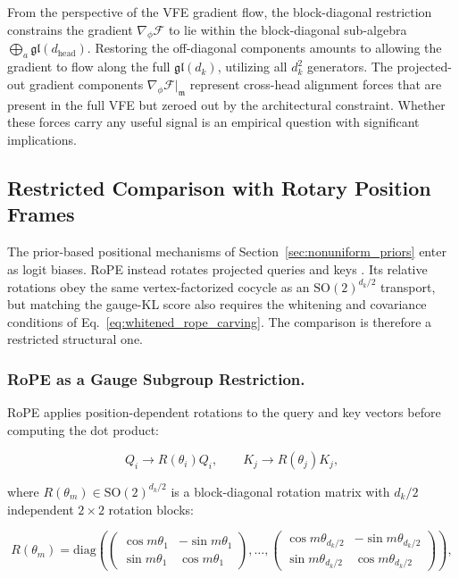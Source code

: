 \documentclass[twoside,11pt]{article}
\begin{document}
From the perspective of the VFE gradient flow, the block-diagonal restriction constrains the gradient $\nabla_\phi \mathcal{F}$ to lie within the block-diagonal sub-algebra $\bigoplus_a \mathfrak{gl}(d_{\text{head}})$. Restoring the off-diagonal components amounts to allowing the gradient to flow along the full $\mathfrak{gl}(d_k)$, utilizing all $d_k^2$ generators. The projected-out gradient components $\nabla_\phi \mathcal{F}\big|_{\mathfrak{m}}$ represent cross-head alignment forces that are present in the full VFE but zeroed out by the architectural constraint. Whether these forces carry any useful signal is an empirical question with significant implications.



\subsection{Restricted Comparison with Rotary Position Frames}
\label{sec:rope}

The prior-based positional mechanisms of Section~\ref{sec:nonuniform_priors} enter as logit biases. RoPE instead rotates projected queries and keys \citep{su2024roformer}. Its relative rotations obey the same vertex-factorized cocycle as an $\mathrm{SO}(2)^{d_k/2}$ transport, but matching the gauge-KL score also requires the whitening and covariance conditions of Eq.~\eqref{eq:whitened_rope_carving}. The comparison is therefore a restricted structural one.

\subsubsection{RoPE as a Gauge Subgroup Restriction.}

RoPE applies position-dependent rotations to the query and key vectors before computing the dot product:

\begin{equation}
Q_i \to R(\theta_i) Q_i, \qquad K_j \to R(\theta_j) K_j,
\end{equation}

where $R(\theta_m) \in \mathrm{SO}(2)^{d_k/2}$ is a block-diagonal rotation matrix with $d_k/2$ independent $2\times 2$ rotation blocks:

\begin{equation}
R(\theta_m) = \mathrm{diag} \left(
\begin{pmatrix} \cos m\theta_1 & -\sin m\theta_1 \\ \sin m\theta_1 & \cos m\theta_1 \end{pmatrix},
 \ldots ,
\begin{pmatrix} \cos m\theta_{d_k/2} & -\sin m\theta_{d_k/2} \\ \sin m\theta_{d_k/2} & \cos m\theta_{d_k/2} \end{pmatrix}
\right),
\label{eq:rope_rotation}
\end{equation}
\end{document}
